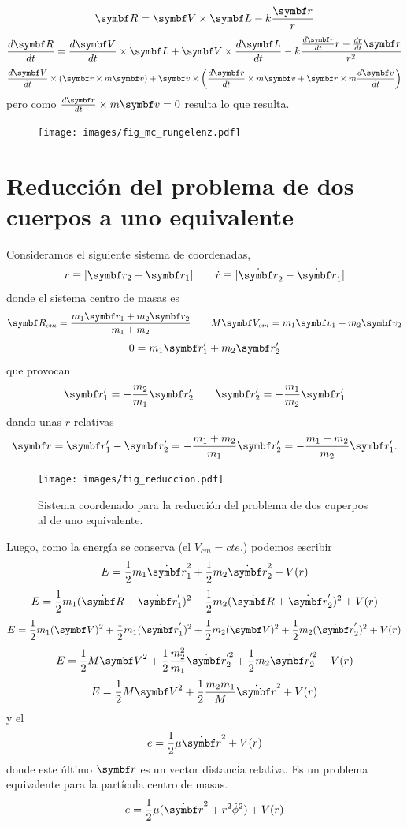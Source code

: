 \documentclass[10pt,oneside]{CBFT_book}
\begin{document}
\[
	\vb{R} = \vb{V} \times \vb{L} - k\frac{\vb{r}}{r}
\]
\[
	\dtot{\vb{R}}{t} = \dtot{\vb{V}}{t} \times \vb{L} + \vb{V} \times \dtot{\vb{L}}{t} -
	k\frac{\dtot{\vb{r}}{t} r - \dtot{r}{t} \vb{r}  }{r^2}
\]
\[
	\dtot{\vb{V}}{t} \times ( \vb{r} \times m\vb{v} ) +
	\vb{v} \times \left( \dtot{\vb{r}}{t} \times m\vb{v} + \vb{r} \times m\dtot{\vb{v}}{t} \right)
\]
pero como $\dtot{\vb{r}}{t} \times m\vb{v} = 0$ resulta lo que resulta.
\begin{figure}[hbt]
	\begin{center}
	\texttt{[image: images/fig\_mc\_rungelenz.pdf]}	 
	\end{center}
	\caption{}
\end{figure} 

\section{Reducción del problema de dos cuerpos a uno equivalente}

Consideramos el siguiente sistema de coordenadas,
\[
	r \equiv | \vb{r}_2 - \vb{r}_1 |	\qquad		 \dot{r} \equiv | \dot{\vb{r}}_2 - \dot{\vb{r}}_1 |
\]
donde el sistema centro de masas es
\[
	\vb{R}_{cm} = \frac{ m_1\vb{r}_1 + m_2\vb{r}_2 }{ m_1 + m_2 }	\qquad 
	M \vb{V}_{cm} =  m_1\vb{v}_1 + m_2\vb{v}_2 
\]
\[
	0 = m_1\vb{r}_1' + m_2\vb{r}_2'
\]
que provocan
\[
	\vb{r}_1' = -\frac{m_2}{m_1}\vb{r}_2' \qquad   \vb{r}_2' = -\frac{m_1}{m_2}\vb{r}_1' 
\]
dando unas $r$ relativas
\[
	\vb{r} = \vb{r}_1' - \vb{r}_2' = -\frac{ m_1 + m_2 }{ m_1 } \vb{r}_2' = -\frac{ m_1 + m_2 }{ m_2 } \vb{r}_1'.
\]

\begin{figure}
	\begin{center}
	\texttt{[image: images/fig\_reduccion.pdf]}	 
	\end{center}
	\caption{Sistema coordenado para la reducción del problema de dos cuperpos al de uno equivalente.}
\end{figure} 

Luego, como la energía se conserva (el $V_{cm}=cte.$) podemos escribir
\[
	E = \frac{1}{2} m_1 \dot{\vb{r}}_1^2 + \frac{1}{2} m_2 \dot{\vb{r}}_2^2 + V(r)
\]
\[
	E = \frac{1}{2} m_1 ( \dot{\vb{R}} + \dot{\vb{r}}_1' )^2 + \frac{1}{2} m_2 ( \dot{\vb{R}} + \dot{\vb{r}}_2' )^2 + V(r)
\]
\[
	E = \frac{1}{2} m_1 ( {\vb{V}} )^2 +  \frac{1}{2} m_1 ( \dot{\vb{r}}_1' )^2 + 
		\frac{1}{2} m_2 ( {\vb{V}})^2 + \frac{1}{2} m_2 (\dot{\vb{r}}_2' )^2 + V(r)
\]
\[
	E = \frac{1}{2} M {\vb{V}}^2 + \frac{1}{2} \frac{m_2^2}{m_1} \dot{\vb{r}}_2'^2 + \frac{1}{2} m_2 \dot{\vb{r}}_2'^2 + V(r)
\]
\[
	E = \frac{1}{2} M {\vb{V}}^2 + \frac{1}{2} \frac{m_2 m_1}{M} \dot{\vb{r}}^2 + V(r)
\]
y el 
\[
	e = \frac{1}{2} \mu \dot{\vb{r}}^2 + V(r)
\]
donde este último $\vb{r}$ es un vector distancia relativa. Es un problema equivalente para la partícula
centro de masas.
\[
	e = \frac{1}{2} \mu ( \dot{\vb{r}}^2 + r^2\dot{\phi}^2 ) + V(r)
\]
\end{document}
